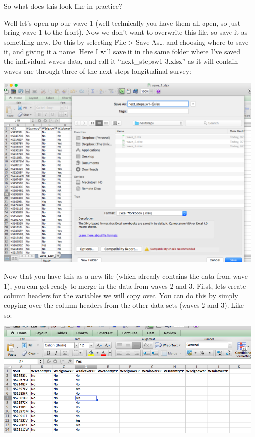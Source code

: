 \documentclass[]{book}
\theoremstyle{definition}
\theoremstyle{definition}
\theoremstyle{definition}
\theoremstyle{remark}
\begin{document}
So what does this look like in practice?

Well let's open up our wave 1 (well technically you have them all open,
so just bring wave 1 to the front). Now we don't want to overwrite this
file, so save it as something new. Do this by selecting File
\textgreater{} Save As\ldots{} and choosing where to save it, and giving
it a name. Here I will save it in the same folder where I've saved the
individual waves data, and call it ``next\_stepsw1-3.xlsx'' as it will
contain waves one through three of the next steps longitudinal survey:

\includegraphics{imgs/rename.png}

Now that you have this as a new file (which already contains the data
from wave 1), you can get ready to merge in the data from waves 2 and 3.
First, lets create column headers for the variables we will copy over.
You can do this by simply copying over the column headers from the other
data sets (waves 2 and 3). Like so:

\includegraphics{imgs/merge_copy_headers.png}
\end{document}
